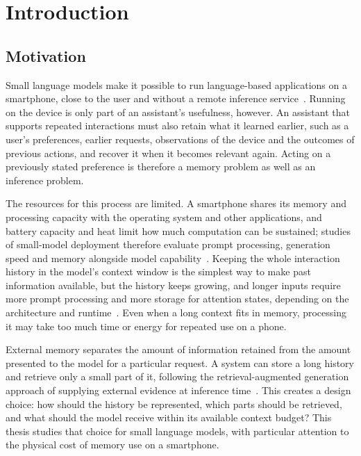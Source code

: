 
\chapter{Introduction}
\label{ch:introduction}

\section{Motivation}
\label{sec:ch1_motivation}

Small language models make it possible to run language-based applications on a
smartphone, close to the user and without a remote inference service~\citep{ondevice_lm_review}.
Running on the device is only part of an assistant's usefulness, however. An assistant that
supports repeated interactions must also retain what it learned earlier, such as a user's
preferences, earlier requests, observations of the device and the outcomes of previous
actions, and recover it when it becomes relevant again. Acting on a previously stated
preference is therefore a memory problem as well as an inference problem.

The resources for this process are limited. A smartphone shares its memory and processing
capacity with the operating system and other applications, and battery capacity and heat
limit how much computation can be sustained; studies of small-model deployment therefore
evaluate prompt processing, generation speed and memory alongside model
capability~\citep{slm_edge_deployment}. Keeping the whole interaction history in the model's
context window is the simplest way to make past information available, but the history keeps
growing, and longer inputs require more prompt processing and more storage for attention
states, depending on the architecture and runtime~\citep{ondevice_lm_review}. Even when a long
context fits in memory, processing it may take too much time or energy for repeated use on a
phone.

External memory separates the amount of information retained from the amount presented to the
model for a particular request. A system can store a long history and retrieve only a small part
of it, following the retrieval-augmented generation approach of supplying external evidence at
inference time~\citep{rag_lewis}. This creates a design choice: how should the history be
represented, which parts should be retrieved, and what should the model receive within its
available context budget? This thesis studies that choice for small language models, with
particular attention to the physical cost of memory use on a smartphone.

